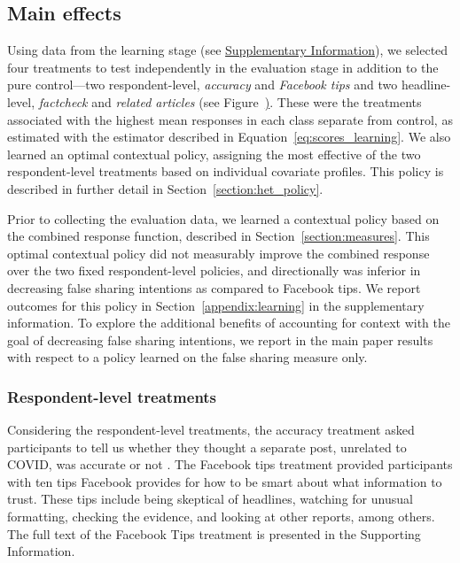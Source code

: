 \documentclass[letterpaper, 12pt, parskip=full,DIV=10]{scrartcl}
\begin{document}
\subsection{Main effects}
Using data from the learning stage (see \hyperref[SI]{Supplementary Information}), we selected four treatments to test independently in the evaluation stage in addition to the pure control---two respondent-level, \textit{accuracy} and \textit{Facebook tips} and two headline-level, \textit{factcheck} and \textit{related articles} (see Figure~\href{x}). These were the treatments associated with the highest mean responses in each class separate from control, as estimated with the estimator described in Equation~\ref{eq:scores_learning}. We also learned an optimal contextual policy, assigning the most effective of the two respondent-level treatments based on individual covariate profiles. This policy is described in further detail in Section~\ref{section:het_policy}.  

Prior to collecting the evaluation data, we learned a contextual policy based on the combined response function, described in Section~\ref{section:measures}. This optimal contextual policy did not measurably improve the combined response over the two fixed respondent-level policies, and directionally was inferior in decreasing false sharing intentions as compared to Facebook tips. We report outcomes for this policy in Section~\ref{appendix:learning} in the supplementary information. To explore the additional benefits of accounting for context with the goal of decreasing false sharing intentions, we report in the main paper results with respect to a policy learned on the false sharing measure only. 

\subsubsection{Respondent-level treatments}
Considering the respondent-level treatments, the accuracy treatment asked participants to tell us whether they thought a separate post, unrelated to COVID, was accurate or not \citep{pennycook2020fighting}. The Facebook tips treatment provided participants with ten tips Facebook provides for how to be smart about what information to trust. These tips include being skeptical of headlines, watching for unusual formatting, checking the evidence, and looking at other reports, among others. The full text of the Facebook Tips treatment is presented in the Supporting Information. 
\end{document}
